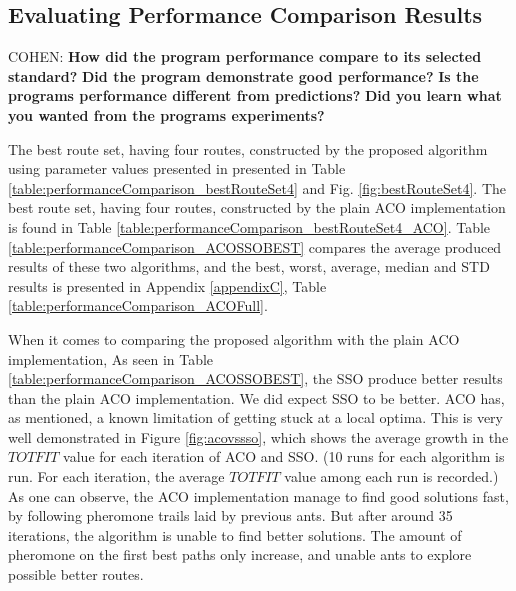 \subsection{Evaluating Performance Comparison Results}


COHEN:
\textbf{How did the program performance compare to its selected standard?} 
\textbf{Did the program demonstrate good performance?}
\textbf{Is the programs performance different from predictions?} 
\textbf{Did you learn what you wanted from the programs experiments?}

The best route set, having four routes, constructed by the proposed algorithm using parameter values presented in presented in Table \vref{table:performanceComparison_bestRouteSet4} and Fig. \vref{fig:bestRouteSet4}.  The best route set, having four routes, constructed by the plain ACO implementation is found in Table \vref{table:performanceComparison_bestRouteSet4_ACO}. Table \vref{table:performanceComparison_ACOSSOBEST} compares the average produced results of these two algorithms, and the best, worst, average, median and STD results is presented in Appendix \ref{appendixC}, Table \vref{table:performanceComparison_ACOFull}.

When it comes to comparing the proposed algorithm with the plain ACO implementation, As seen in Table \vref{table:performanceComparison_ACOSSOBEST}, the SSO produce better results than the plain ACO implementation. We did expect SSO to be better. ACO has, as mentioned, a known limitation of getting stuck at a local optima. This is very well demonstrated in Figure \ref{fig:acovssso}, which shows the average growth in the $TOTFIT$ value for each iteration of ACO and SSO. (10 runs for each algorithm is run. For each iteration, the average $TOTFIT$ value among each run is recorded.) As one can observe, the ACO implementation manage to find good solutions fast, by following pheromone trails laid by previous ants. But after around 35 iterations, the algorithm is unable to find better solutions. The amount of pheromone on the first best paths only increase, and unable ants to explore possible better routes. 

